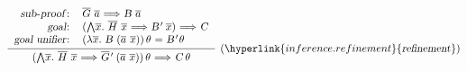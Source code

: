 \begin{isabellebody}
\begin{isamarkuptext}
  \[
  \infer[(\hyperlink{inference.refinement}{\mbox{\isa{refinement}}})]
  {\isa{{\isaliteral{22}{\isachardoublequote}}{\isaliteral{28}{\isacharparenleft}}{\isaliteral{5C3C416E643E}{\isasymAnd}}\isaliteral{5C3C5E7665633E}{}\isactrlvec x{\isaliteral{2E}{\isachardot}}\ \isaliteral{5C3C5E7665633E}{}\isactrlvec H\ \isaliteral{5C3C5E7665633E}{}\isactrlvec x\ {\isaliteral{5C3C4C6F6E6772696768746172726F773E}{\isasymLongrightarrow}}\ \isaliteral{5C3C5E7665633E}{}\isactrlvec G{\isaliteral{27}{\isacharprime}}\ {\isaliteral{28}{\isacharparenleft}}\isaliteral{5C3C5E7665633E}{}\isactrlvec a\ \isaliteral{5C3C5E7665633E}{}\isactrlvec x{\isaliteral{29}{\isacharparenright}}{\isaliteral{29}{\isacharparenright}}{\isaliteral{5C3C76617274686574613E}{\isasymvartheta}}\ {\isaliteral{5C3C4C6F6E6772696768746172726F773E}{\isasymLongrightarrow}}\ C{\isaliteral{5C3C76617274686574613E}{\isasymvartheta}}{\isaliteral{22}{\isachardoublequote}}}}
  {\begin{tabular}{rl}
    \isa{{\isaliteral{22}{\isachardoublequote}}sub{\isaliteral{5C3C646173683E}{\isasymdash}}proof{\isaliteral{3A}{\isacharcolon}}{\isaliteral{22}{\isachardoublequote}}} &
    \isa{{\isaliteral{22}{\isachardoublequote}}\isaliteral{5C3C5E7665633E}{}\isactrlvec G\ \isaliteral{5C3C5E7665633E}{}\isactrlvec a\ {\isaliteral{5C3C4C6F6E6772696768746172726F773E}{\isasymLongrightarrow}}\ B\ \isaliteral{5C3C5E7665633E}{}\isactrlvec a{\isaliteral{22}{\isachardoublequote}}} \\
    \isa{{\isaliteral{22}{\isachardoublequote}}goal{\isaliteral{3A}{\isacharcolon}}{\isaliteral{22}{\isachardoublequote}}} &
    \isa{{\isaliteral{22}{\isachardoublequote}}{\isaliteral{28}{\isacharparenleft}}{\isaliteral{5C3C416E643E}{\isasymAnd}}\isaliteral{5C3C5E7665633E}{}\isactrlvec x{\isaliteral{2E}{\isachardot}}\ \isaliteral{5C3C5E7665633E}{}\isactrlvec H\ \isaliteral{5C3C5E7665633E}{}\isactrlvec x\ {\isaliteral{5C3C4C6F6E6772696768746172726F773E}{\isasymLongrightarrow}}\ B{\isaliteral{27}{\isacharprime}}\ \isaliteral{5C3C5E7665633E}{}\isactrlvec x{\isaliteral{29}{\isacharparenright}}\ {\isaliteral{5C3C4C6F6E6772696768746172726F773E}{\isasymLongrightarrow}}\ C{\isaliteral{22}{\isachardoublequote}}} \\
    \isa{{\isaliteral{22}{\isachardoublequote}}goal\ unifier{\isaliteral{3A}{\isacharcolon}}{\isaliteral{22}{\isachardoublequote}}} &
    \isa{{\isaliteral{22}{\isachardoublequote}}{\isaliteral{28}{\isacharparenleft}}{\isaliteral{5C3C6C616D6264613E}{\isasymlambda}}\isaliteral{5C3C5E7665633E}{}\isactrlvec x{\isaliteral{2E}{\isachardot}}\ B\ {\isaliteral{28}{\isacharparenleft}}\isaliteral{5C3C5E7665633E}{}\isactrlvec a\ \isaliteral{5C3C5E7665633E}{}\isactrlvec x{\isaliteral{29}{\isacharparenright}}{\isaliteral{29}{\isacharparenright}}{\isaliteral{5C3C76617274686574613E}{\isasymvartheta}}\ {\isaliteral{3D}{\isacharequal}}\ B{\isaliteral{27}{\isacharprime}}{\isaliteral{5C3C76617274686574613E}{\isasymvartheta}}{\isaliteral{22}{\isachardoublequote}}} \\

\end{tabular}}\]
\end{isamarkuptext}
\end{isabellebody}
